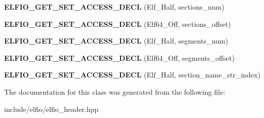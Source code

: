 \begin{DoxyCompactItemize}
\item 
{\bfseries E\+L\+F\+I\+O\+\_\+\+G\+E\+T\+\_\+\+S\+E\+T\+\_\+\+A\+C\+C\+E\+S\+S\+\_\+\+D\+E\+CL} (Elf\+\_\+\+Half, sections\+\_\+num)\hypertarget{class_e_l_f_i_o_1_1elf__header_a4cccb54184ca67532cad18898ffddd57}{}\label{class_e_l_f_i_o_1_1elf__header_a4cccb54184ca67532cad18898ffddd57}

\item 
{\bfseries E\+L\+F\+I\+O\+\_\+\+G\+E\+T\+\_\+\+S\+E\+T\+\_\+\+A\+C\+C\+E\+S\+S\+\_\+\+D\+E\+CL} (Elf64\+\_\+\+Off, sections\+\_\+offset)\hypertarget{class_e_l_f_i_o_1_1elf__header_aab88310d486cc319b37730b8a658a6fd}{}\label{class_e_l_f_i_o_1_1elf__header_aab88310d486cc319b37730b8a658a6fd}

\item 
{\bfseries E\+L\+F\+I\+O\+\_\+\+G\+E\+T\+\_\+\+S\+E\+T\+\_\+\+A\+C\+C\+E\+S\+S\+\_\+\+D\+E\+CL} (Elf\+\_\+\+Half, segments\+\_\+num)\hypertarget{class_e_l_f_i_o_1_1elf__header_aafcebb8735be7a5791d1ee3956329bc0}{}\label{class_e_l_f_i_o_1_1elf__header_aafcebb8735be7a5791d1ee3956329bc0}

\item 
{\bfseries E\+L\+F\+I\+O\+\_\+\+G\+E\+T\+\_\+\+S\+E\+T\+\_\+\+A\+C\+C\+E\+S\+S\+\_\+\+D\+E\+CL} (Elf64\+\_\+\+Off, segments\+\_\+offset)\hypertarget{class_e_l_f_i_o_1_1elf__header_a3e722fc7b7c47e8aedaaa00966099901}{}\label{class_e_l_f_i_o_1_1elf__header_a3e722fc7b7c47e8aedaaa00966099901}

\item 
{\bfseries E\+L\+F\+I\+O\+\_\+\+G\+E\+T\+\_\+\+S\+E\+T\+\_\+\+A\+C\+C\+E\+S\+S\+\_\+\+D\+E\+CL} (Elf\+\_\+\+Half, section\+\_\+name\+\_\+str\+\_\+index)\hypertarget{class_e_l_f_i_o_1_1elf__header_a995676c92a356608b21dbd7db7f4cd51}{}\label{class_e_l_f_i_o_1_1elf__header_a995676c92a356608b21dbd7db7f4cd51}

\end{DoxyCompactItemize}


The documentation for this class was generated from the following file\+:\begin{DoxyCompactItemize}
\item 
include/elfio/elfio\+\_\+header.\+hpp\end{DoxyCompactItemize}
